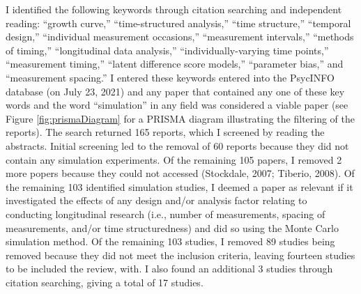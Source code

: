 \documentclass[
  english,
  man,floatsintext]{apa7}
\begin{document}
I identified the following keywords through citation searching and independent reading: ``growth curve,'' ``time-structured analysis,'' ``time structure,'' ``temporal design,'' ``individual measurement occasions,'' ``measurement intervals,'' ``methods of timing,'' ``longitudinal data analysis,'' ``individually-varying time points,'' ``measurement timing,'' ``latent difference score models,'' ``parameter bias,'' and ``measurement spacing.'' I entered these keywords entered into the PsycINFO database (on July 23, 2021) and any paper that contained any one of these key words and the word ``simulation'' in any field was considered a viable paper (see Figure \ref{fig:prismaDiagram} for a PRISMA diagram illustrating the filtering of the reports). The search returned 165 reports, which I screened by reading the abstracts. Initial screening led to the removal of 60 reports because they did not contain any simulation experiments. Of the remaining 105 papers, I removed 2 more popers because they could not accessed (Stockdale, 2007; Tiberio, 2008). Of the remaining 103 identified simulation studies, I deemed a paper as relevant if it investigated the effects of any design and/or analysis factor relating to conducting longitudinal research (i.e., number of measurements, spacing of measurements, and/or time structuredness) and did so using the Monte Carlo simulation method. Of the remaining 103 studies, I removed 89 studies being removed because they did not meet the inclusion criteria, leaving fourteen studies to be included the review, with. I also found an additional 3 studies through citation searching, giving a total of 17 studies.
\end{document}
